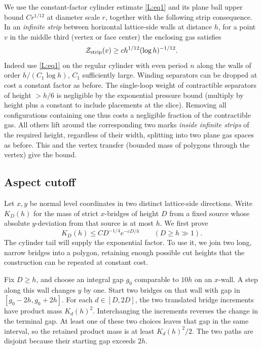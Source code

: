 \documentclass[11pt]{article}
\numberwithin{equation}{section}
\theoremstyle{definition}\newtheorem{definition}[theorem]{Definition}
\theoremstyle{remark}\newtheorem{remark}[theorem]{Remark}
\begin{document}
We use the constant-factor cylinder estimate \eqref{L:eq1} and its plane ball upper bound \(C r^{1/12}\) at diameter scale \(r\), together with the following strip consequence. In an \emph{infinite strip} between horizontal lattice-side walls at distance \(h\), for a point \(v\) in the middle third (vertex or face center) the enclosing gas satisfies
\[
 {\cal Z}_{\rm strip}(v)\ge c h^{1/12}(\log h)^{-1/12}.
\]
Indeed use \eqref{L:eq1} on the regular cylinder with even period \(n\) along the walls of order \(h/(C_1\log h)\), \(C_1\) sufficiently large. Winding separators can be dropped at cost a constant factor as before. The single-loop weight of contractible separators of height \(>h/6\) is negligible by the exponential pressure bound (multiply by height plus a constant to include placements at the slice). Removing all configurations containing one thus costs a negligible fraction of the contractible gas. All others lift around the corresponding two marks \emph{inside infinite strips} of the required height, regardless of their width, splitting into two plane gas spaces as before. This and the vertex transfer (bounded mass of polygons through the vertex) give the bound.

\subsection{Aspect cutoff}\label{L:step18}\label{L:prop:aspect}

Let $x,y$ be normal level coordinates in two distinct lattice-side
 directions.  Write $K_D(h)$ for the mass of strict $x$-bridges of height
$D$ from a fixed source whose absolute $y$-deviation from that source is
at most $h$.  We first prove
\begin{equation}\label{L:eq:aspect-bound}
 K_D(h)\le C D^{-1/4}e^{-cD/h}\qquad(D\ge h\gg1).
\end{equation}
The cylinder tail will supply the exponential factor.  To use it, we
join two long, narrow bridges into a polygon, retaining enough possible
cut heights that the construction can be repeated at constant cost.

Fix $D\ge h$, and choose an integral gap $g_0$ comparable to $10h$
on an $x$-wall.  A step along this wall changes $y$ by one.  Start two
bridges on that wall with gap in $[g_0-2h,g_0+2h]$.  For each
$d\in[D,2D]$, the two translated bridge increments have product mass
$K_d(h)^2$.  Interchanging the increments reverses the change in the
terminal gap.  At least one of these two choices leaves that gap in
the same interval, so the retained product mass is at least
$K_d(h)^2/2$.  The two paths are disjoint because their starting gap
exceeds $2h$.
\end{document}

